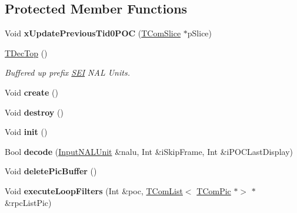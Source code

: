 \subsection*{Protected Member Functions}
\begin{DoxyCompactItemize}
\item 
\mbox{\label{class_t_dec_top_ac5209b1c7600d5a55859305599183e14}} 
Void {\bfseries x\+Update\+Previous\+Tid0\+P\+OC} (\hyperlink{class_t_com_slice}{T\+Com\+Slice} $\ast$p\+Slice)
\end{DoxyCompactItemize}
\begin{DoxyCompactItemize}
\item 
\mbox{\label{class_t_dec_top_af1955adfe6ec39c7a89dcefebaef910c}} 
\hyperlink{class_t_dec_top_af1955adfe6ec39c7a89dcefebaef910c}{T\+Dec\+Top} ()
\begin{DoxyCompactList}\small\item\em Buffered up prefix \hyperlink{class_s_e_i}{S\+EI} N\+AL Units. \end{DoxyCompactList}\item 
\mbox{\label{class_t_dec_top_a4fb11d1e7ca3ca08a808525f1f588d90}} 
Void {\bfseries create} ()
\item 
\mbox{\label{class_t_dec_top_a1a9b36dbcb531fbcc6e8cefe74a36960}} 
Void {\bfseries destroy} ()
\item 
\mbox{\label{class_t_dec_top_a2574080644f6c07ac647f31a0ccd88c7}} 
Void {\bfseries init} ()
\item 
\mbox{\label{class_t_dec_top_a70cf3d883d75b7d5d5300f81414c089b}} 
Bool {\bfseries decode} (\hyperlink{class_input_n_a_l_unit}{Input\+N\+A\+L\+Unit} \&nalu, Int \&i\+Skip\+Frame, Int \&i\+P\+O\+C\+Last\+Display)
\item 
\mbox{\label{class_t_dec_top_a1cb4402c975ad5a119fb2c52a9fff044}} 
Void {\bfseries delete\+Pic\+Buffer} ()
\item 
\mbox{\label{class_t_dec_top_a49bb446e283fd48dfe2b8b05b7989dc1}} 
Void {\bfseries execute\+Loop\+Filters} (Int \&poc, \hyperlink{class_t_com_list}{T\+Com\+List}$<$ \hyperlink{class_t_com_pic}{T\+Com\+Pic} $\ast$$>$ $\ast$\&rpc\+List\+Pic)
$$
\end{DoxyCompactItemize}

